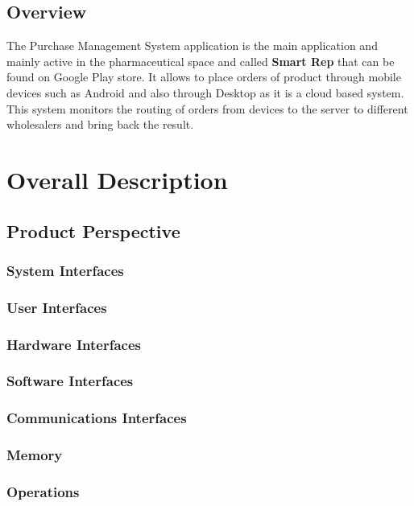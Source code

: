 \documentclass[a4paper,10pt]{article}
\begin{document}
	\subsection{Overview} 
	The Purchase Management System application is the main application and mainly active in the pharmaceutical space and called \textbf{Smart Rep} that can be found on Google Play store. It allows to place orders of product through mobile devices such as Android and also through Desktop as it is a cloud based system. This system monitors the routing of orders from devices to the server to different wholesalers and bring back the result.
\section{Overall Description}

	\subsection{Product Perspective}
	
		\subsubsection{System Interfaces}

		\subsubsection{User Interfaces}

		\subsubsection{Hardware Interfaces}

		\subsubsection{Software Interfaces}

		\subsubsection{Communications Interfaces}
	
		\subsubsection{Memory}

		\subsubsection{Operations}
\end{document}
